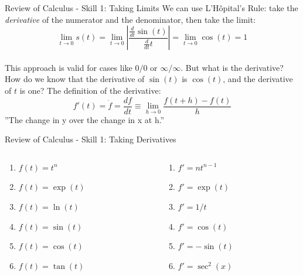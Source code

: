 \documentclass{beamer}
\begin{document}
\begin{frame}{Review of Calculus - Skill 1: Taking Limits}
We can use \alert{L'H\^{o}pital's Rule}: take the \textit{derivative} of the numerator and the denominator, then take the limit: \\
\begin{equation}
\lim_{t\to 0} s(t)  = \lim_{t\to 0} \left| \frac{\frac{d}{dt}\sin(t)}{\frac{d}{dt}t}\right| = \lim_{t\to 0} \cos(t) = 1
\end{equation} \\
This approach is valid for cases like $0/0$ or $\infty/\infty$.  But what is the \alert{derivative}?  How do we know that the derivative of $\sin(t)$ is $\cos(t)$, and the derivative of $t$ is one? The definition of the derivative:
\begin{equation}
f'(t) = \dot{f} = \frac{df}{dt} \equiv \lim_{h \to 0} \frac{f(t+h) - f(t)}{h}
\end{equation}
''The change in y over the change in x at h.''
\end{frame}

\begin{frame}{Review of Calculus - Skill 1: Taking Derivatives}
\begin{columns}[T]
\begin{column}{0.5\textwidth}
\begin{enumerate}
\item $f(t) = t^n$
\item $f(t) = \exp(t)$
\item $f(t) = \ln(t)$
\item $f(t) = \sin(t)$
\item $f(t) = \cos(t)$
\item $f(t) = \tan(t)$
\end{enumerate}
\end{column}
\begin{column}{0.5\textwidth}
\begin{enumerate}
\item $f' = nt^{n-1}$
\item $f' = \exp(t)$
\item $f' = 1/t$
\item $f' = \cos(t)$
\item $f' = -\sin(t)$
\item $f' = \sec^2(x)$
\end{enumerate}
\end{column}
\end{columns}
\end{frame}
\end{document}
